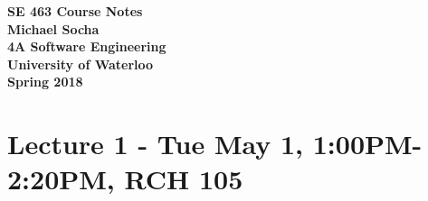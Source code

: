 \documentclass[12pt,titlepage]{article}
\begin{document}
  \begin{titlepage}
    \vspace*{\fill}
    \centering

    \textbf{\Huge SE 463 Course Notes} \\ [1em]
    \textbf{\Large Michael Socha} \\ [1em]
    \textbf{\large 4A Software Engineering} \\
    \textbf{\large University of Waterloo} \\
    \textbf{\large Spring 2018} \\
    \vspace*{\fill}
  \end{titlepage}

  \newpage 

  \section*{Lecture 1 - Tue May 1, 1:00PM-2:20PM, RCH 105}
\end{document}
